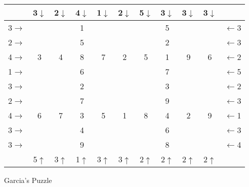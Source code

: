 \documentclass{article}
\begin{document}
\begin{center}\Large
\begin{tabular}{c||c|c|c||c|c|c||c|c|c||c}
  & 3\(\downarrow\) & 2\(\downarrow\) & 4\(\downarrow\) & 1\(\downarrow\) & 2\(\downarrow\) & 5\(\downarrow\) & 3\(\downarrow\) & 3\(\downarrow\) & 3\(\downarrow\) &   \\\hline\hline
3\(\rightarrow\) &   & \color{mygray}{$\clubsuit$} & 1 &   &   &   & 5 &   &   & \(\leftarrow\)3 \\\hline
2\(\rightarrow\) &   &   & 5 &   & \color{mygray}{$\heartsuit$} &   & 2 &   & \color{mygray}{$\clubsuit$} & \(\leftarrow\)3 \\\hline
4\(\rightarrow\) & 3 & 4 & 8 & 7 & 2 & 5 & 1 & 9 & 6 & \(\leftarrow\)2 \\\hline\hline
1\(\rightarrow\) &   &   & 6 & \color{mygray}{$\clubsuit$} &   &   & 7 &   &   & \(\leftarrow\)5 \\\hline
3\(\rightarrow\) & \color{mygray}{$\diamondsuit$} &   & 2 & \color{mygray}{$\heartsuit$} &   & \color{mygray}{$\spadesuit$} & 3 & \color{mygray}{$\nabla$} &   & \(\leftarrow\)2 \\\hline
2\(\rightarrow\) &   & \color{mygray}{$\star$} & 7 &   &   &   & 9 &   & \color{mygray}{$\diamondsuit$} & \(\leftarrow\)3 \\\hline\hline
4\(\rightarrow\) & 6 & 7 & 3 & 5 & 1 & 8 & 4 & 2 & 9 & \(\leftarrow\)1 \\\hline
3\(\rightarrow\) &   & \color{mygray}{$\heartsuit$} & 4 &   & \color{mygray}{$\nabla$} &   & 6 & \color{mygray}{$\spadesuit$} &   & \(\leftarrow\)3 \\\hline
3\(\rightarrow\) &   &   & 9 &   &   & \color{mygray}{$\diamondsuit$} & 8 &   &   & \(\leftarrow\)4 \\\hline\hline
  & 5\(\uparrow\) & 3\(\uparrow\) & 1\(\uparrow\) & 3\(\uparrow\) & 3\(\uparrow\) & 2\(\uparrow\) & 2\(\uparrow\) & 2\(\uparrow\) & 2\(\uparrow\) &
\end{tabular}
\end{center}


\newpage

Garcia's Puzzle


\newcommand{\phCommandColumn}[5]{
\fill[color=lightgray] (\theXPos,3) rectangle +(1,2);
\draw[step=1] (\theXPos,0) grid +(1,5);
\draw[very thick] (\theXPos,3) -- +(1,0);
\node at (\theXPos.5,4.5) {#1};
\node at (\theXPos.5,3.5) {#2};
\node at (\theXPos.5,2.5) {#3};
\node at (\theXPos.5,1.5) {#4};
\node at (\theXPos.5,0.5) {#5};
\stepcounter{XPos}
}
\end{document}
